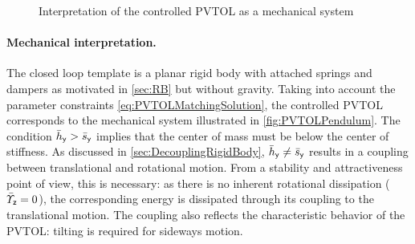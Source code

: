 \begin{figure}
 \centering
 
 \caption{Interpretation of the controlled PVTOL as a mechanical system} 
 \label{fig:PVTOLPendulum}
\end{figure}

\paragraph{Mechanical interpretation.}
The closed loop template is a planar rigid body with attached springs and dampers as motivated in \autoref{sec:RB} but without gravity.
Taking into account the parameter constraints \eqref{eq:PVTOLMatchingSolution}, the controlled PVTOL corresponds to the mechanical system illustrated in \autoref{fig:PVTOLPendulum}.
The condition $\bar{h}_{\mathsf{y}} > \bar{s}_{\mathsf{y}}$ implies that the center of mass must be below the center of stiffness.
As discussed in \autoref{sec:DecouplingRigidBody}, $\bar{h}_{\mathsf{y}} \neq \bar{s}_{\mathsf{y}}$ results in a coupling between translational and rotational motion.
From a stability and attractiveness point of view, this is necessary: as there is no inherent rotational dissipation ($\bar{\varUpsilon}_{\mathsf{z}} = 0$), the corresponding energy is dissipated through its coupling to the translational motion.
The coupling also reflects the characteristic behavior of the PVTOL: tilting is required for sideways motion.



